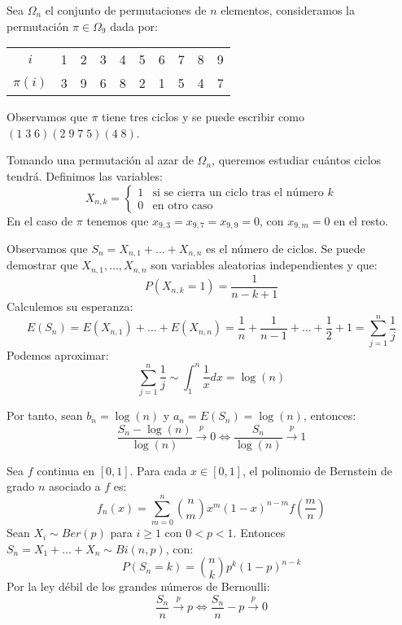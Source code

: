 \begin{example}
    Sea $\Omega_n$ el conjunto de permutaciones de $n$ elementos, consideramos la permutación $\pi \in \Omega_9$ dada por:
    \begin{center}
        \begin{tabular}{ c | c c c c c c c c c}
            $i$      & 1 & 2 & 3 & 4 & 5 & 6 & 7 & 8 & 9 \\
            $\pi(i)$ & 3 & 9 & 6 & 8 & 2 & 1 & 5 & 4 & 7
        \end{tabular}
    \end{center}
    Observamos que $\pi$ tiene tres ciclos y se puede escribir como $(1 \; 3 \; 6)(2 \; 9 \; 7 \; 5)(4 \; 8)$.

    Tomando una permutación al azar de $\Omega_n$, queremos estudiar cuántos ciclos tendrá.
    Definimos las variables:
    $$X_{n, k} = \begin{cases}
            1 & \text{si se cierra un ciclo tras el número } k \\
            0 & \text{en otro caso}
        \end{cases}$$
    En el caso de $\pi$ tenemos que $x_{9, 3} = x_{9, 7} = x_{9, 9} = 0$, con $x_{9, m} = 0$ en el resto.

    Observamos que $S_n = X_{n, 1} + \dots + X_{n, n}$ es el número de ciclos.
    Se puede demostrar que $X_{n, 1}, \dots, X_{n, n}$ son variables aleatorias independientes y que:
    $$P(X_{n, k} = 1) = \frac{1}{n-k+1}$$
    Calculemos su esperanza:
    $$E(S_n) = E(X_{n, 1}) + \dots + E(X_{n, n}) = \frac{1}{n} + \frac{1}{n-1} + \dots + \frac{1}{2} + 1 = \sum_{j=1}^n \frac{1}{j}$$
    Podemos aproximar:
    $$\sum_{j=1}^n \frac{1}{j} \sim \int_1^n \frac{1}{x}dx = \log(n)$$

    Por tanto, sean $b_n = \log(n)$ y $a_n = E(S_n) = \log(n)$, entonces:
    $$\frac{S_n - \log(n)}{\log(n)} \xrightarrow{p} 0 \Leftrightarrow \frac{S_n}{\log(n)} \xrightarrow{p} 1$$
\end{example}

\begin{example}
    Sea $f$ continua en $[0, 1]$.
    Para cada $x \in [0, 1]$, el polinomio de Bernstein de grado $n$ asociado a $f$ es:
    $$f_n(x) = \sum_{m=0}^n \binom{n}{m}x^m(1-x)^{n-m}f\left(\frac{m}{n}\right)$$
    Sean $X_i \sim Ber(p)$ para $i \geq 1$ con $0 < p < 1$.
    Entonces $S_n = X_1 + \dots + X_n \sim Bi(n, p)$, con:
    $$P(S_n = k) = \binom{n}{k}p^k(1-p)^{n-k}$$
    Por la ley débil de los grandes números de Bernoulli:
    $$\frac{S_n}{n} \xrightarrow{p} p \Leftrightarrow \frac{S_n}{n} - p \xrightarrow{p} 0$$
\end{example}